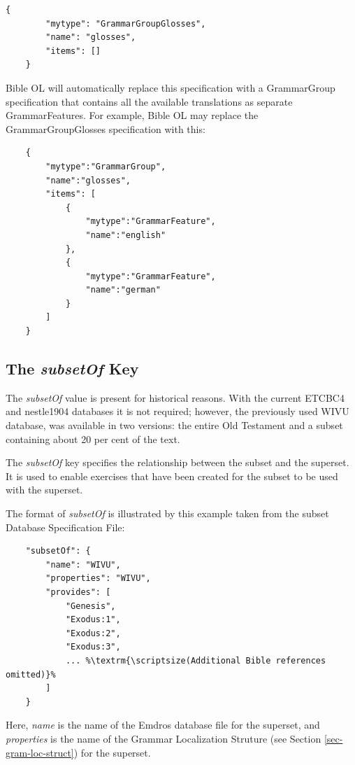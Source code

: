 \documentclass[11pt,oneside,a4paper]{memoir}
\begin{document}
\begin{lstlisting}[caption=GrammarGroupGlosses syntax,label=list-ggg-syntax]
    {
        "mytype": "GrammarGroupGlosses",
        "name": "glosses",
        "items": []
    }
\end{lstlisting}
 
Bible OL will automatically replace this specification with a GrammarGroup specification that
contains all the available translations as separate GrammarFeatures. For example, Bible OL may
replace the GrammarGroupGlosses specification with this:
 
\begin{lstlisting}
    {
        "mytype":"GrammarGroup",
        "name":"glosses",
        "items": [
            {
                "mytype":"GrammarFeature",
                "name":"english"
            },
            {
                "mytype":"GrammarFeature",
                "name":"german"
            }
        ]
    }
\end{lstlisting}


\subsection{The \emph{subsetOf} Key}\label{subsetof}

The \emph{subsetOf} value is present for historical reasons. With the current ETCBC4 and nestle1904
databases it is not required; however, the previously used WIVU database, was available in two
versions: the entire Old Testament and a subset containing about 20 per cent of the text.

The \emph{subsetOf} key specifies the relationship between the subset and the superset. It is used
to enable exercises that have been created for the subset to be used with the superset.

The format of \emph{subsetOf} is illustrated by this example taken from the subset Database
Specification File:

\begin{lstlisting}
    "subsetOf": {
        "name": "WIVU",
        "properties": "WIVU",
        "provides": [
            "Genesis",
            "Exodus:1",
            "Exodus:2",
            "Exodus:3",
            ... %\textrm{\scriptsize(Additional Bible references omitted)}%
        ]
    }
\end{lstlisting}

Here, \emph{name} is the name of the Emdros database file for the superset, and \emph{properties} is
the name of the Grammar Localization Struture (see
Section \ref{sec-gram-loc-struct}) for the superset.
\end{document}
